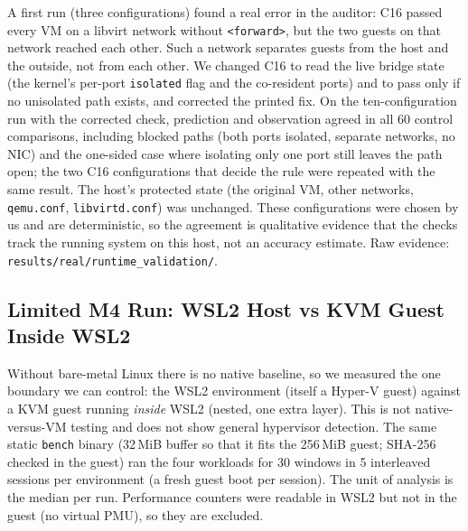 \documentclass[conference]{IEEEtran}
\begin{document}
A first run (three configurations) found a real error in the auditor: C16 passed every VM on a libvirt network without \texttt{<forward>}, but the two guests on that network reached each other. Such a network separates guests from the host and the outside, not from each other. We changed C16 to read the live bridge state (the kernel's per-port \texttt{isolated} flag and the co-resident ports) and to pass only if no unisolated path exists, and corrected the printed fix. On the ten-configuration run with the corrected check, prediction and observation agreed in all 60 control comparisons, including blocked paths (both ports isolated, separate networks, no NIC) and the one-sided case where isolating only one port still leaves the path open; the two C16 configurations that decide the rule were repeated with the same result. The host's protected state (the original VM, other networks, \texttt{qemu.conf}, \texttt{libvirtd.conf}) was unchanged. These configurations were chosen by us and are deterministic, so the agreement is qualitative evidence that the checks track the running system on this host, not an accuracy estimate. Raw evidence: \texttt{results/real/runtime\_validation/}.

\subsection{Limited M4 Run: WSL2 Host vs KVM Guest Inside WSL2}\label{sec:m4wsl}
Without bare-metal Linux there is no native baseline, so we measured the one boundary we can control: the WSL2 environment (itself a Hyper-V guest) against a KVM guest running \emph{inside} WSL2 (nested, one extra layer). This is not native-versus-VM testing and does not show general hypervisor detection. The same static \texttt{bench} binary (32\,MiB buffer so that it fits the 256\,MiB guest; SHA-256 checked in the guest) ran the four workloads for 30 windows in 5 interleaved sessions per environment (a fresh guest boot per session). The unit of analysis is the median per run. Performance counters were readable in WSL2 but not in the guest (no virtual PMU), so they are excluded.
\end{document}
